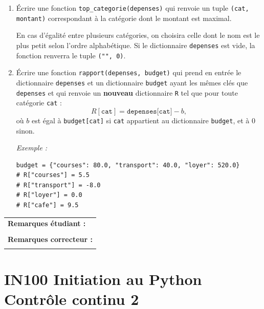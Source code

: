 \documentclass[a4paper,11pt]{article}
\begin{document}
\begin{enumerate}
\item Écrire une fonction \texttt{top\_categorie(depenses)} qui renvoie un tuple
\texttt{(cat, montant)} correspondant à la catégorie dont le montant est maximal.

En cas d’égalité entre plusieurs catégories, on choisira celle dont le nom est le plus petit
selon l’ordre alphabétique.  
Si le dictionnaire \texttt{depenses} est vide, la fonction renverra le tuple \texttt{("", 0)}.

\item Écrire une fonction \texttt{rapport(depenses, budget)} qui prend en entrée le dictionnaire \texttt{depenses} et un dictionnaire \texttt{budget}
ayant les mêmes clés que \texttt{depenses} 
et qui renvoie un \textbf{nouveau}
dictionnaire \texttt{R}  tel que pour toute catégorie
\texttt{cat} :
\[
R[\texttt{cat}] = \texttt{depenses[cat]} - b,
\]
où \( b \) est égal à \texttt{budget[cat]} si \texttt{cat} appartient au dictionnaire
\texttt{budget}, et à \( 0 \) sinon.


\medskip

\textit{Exemple :}
\begin{verbatim}
budget = {"courses": 80.0, "transport": 40.0, "loyer": 520.0}
# R["courses"] = 5.5
# R["transport"] = -8.0
# R["loyer"] = 0.0
# R["cafe"] = 9.5
\end{verbatim}
\end{enumerate}



\vspace{-0.5 cm}
\begin{table}[h!]
\centering
\renewcommand{\arraystretch}{1.4} %
\begin{tabular}{|p{15cm}|}
\hline
\textbf{Remarques étudiant :}    \\
 \\
\hline
\textbf{Remarques correcteur :}  \\
 \\
\hline
\end{tabular}
\end{table}



\newpage

\section*{\center IN100 Initiation au Python\\
Contrôle continu 2}
\end{document}
